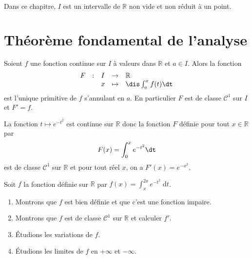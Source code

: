 \documentclass[a4paper,10pt]{report}
\begin{document}


\noindent Dans ce chapitre, $I$ est un intervalle de $\mathbb{R}$ non vide et non réduit à un point.
\section{Théorème fondamental de l'analyse}

\begin{thm} Soient $f$ une fonction continue sur $I$ à valeurs dans $\mathbb{R}$ et $a \in I$. Alors la fonction 
$$ \begin{array}{cllll}
F & : & I & \rightarrow & \mathbb{R} \\
 & & x & \mapsto & \dis \int_{a}^x f(t) \dt \\
\end{array}$$
est l'unique primitive de $f$ s'annulant en $a$. En particulier $F$ est de classe $\mathcal{C}^1$ sur $I$ et $F'=f$.
\end{thm} 

\begin{ex} La fonction $t \mapsto e^{-t^2}$ est continue sur $\mathbb{R}$ donc la fonction $F$ définie pour tout $x \in \mathbb{R}$ par 
$$ F(x) = \int_{0}^x e^{-t^2} \dt$$
est de classe $\mathcal{C}^1$ sur $\mathbb{R}$ et pour tout réel $x$, on a $F'(x)=e^{-x^2}$.
\end{ex}

\medskip

\begin{ex} Soit $f$ la fonction définie sur $\mathbb{R}$ par $\displaystyle{f(x)=\int_x^{2x} e^{-t^2}\;\text{d}t}$.
\begin{enumerate}
\item Montrons que $f$ est bien définie et que c'est une fonction impaire.

\vspace{5cm}
\item Montrons que $f$ est de classe $\mathcal{C}^1$ sur $\mathbb{R}$ et calculer $f'$.

\vspace{5cm}

\item Étudions les variations de $f$.

\vspace{5cm}
\newpage

\item Étudions les limites de $f$ en $+ \infty$ et $- \infty$.

\vspace{7cm}
\end{enumerate}
\end{ex}
\end{document}
